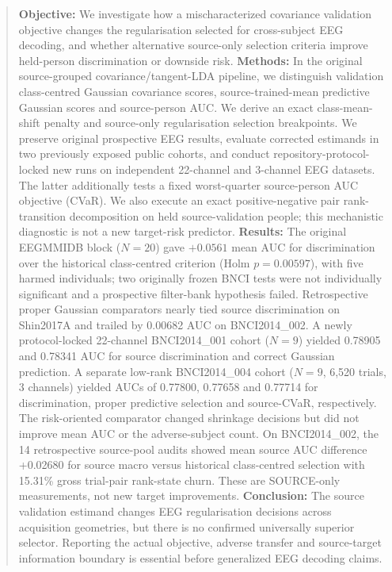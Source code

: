 \begin{abstract}
\textbf{Objective:} We investigate how a
mischaracterized covariance validation
objective changes the regularisation
selected for cross-subject EEG decoding,
and whether alternative source-only
selection criteria improve held-person
discrimination or downside risk.
\textbf{Methods:} In the original
source-grouped covariance/tangent-LDA
pipeline, we distinguish validation
class-centred Gaussian covariance
scores, source-trained-mean predictive
Gaussian scores and source-person
AUC. We derive an exact class-mean-shift
penalty and source-only regularisation
selection breakpoints. We preserve
original prospective EEG results,
evaluate corrected estimands in two
previously exposed public cohorts,
and conduct repository-protocol-locked
new runs on independent 22-channel and
3-channel EEG datasets. The latter
additionally tests a fixed worst-quarter
source-person AUC objective (CVaR).
We also execute an exact positive-negative
pair rank-transition decomposition on
held source-validation people; this
mechanistic diagnostic is not a new
target-risk predictor.
\textbf{Results:} The original EEGMMIDB
block ($N=20$) gave $+0.0561$ mean AUC
for discrimination over the historical
class-centred criterion
(Holm $p=0.00597$), with five harmed
individuals; two originally frozen
BNCI tests were not individually
significant and a prospective
filter-bank hypothesis failed.
Retrospective proper Gaussian
comparators nearly tied source
discrimination on Shin2017A and
trailed by 0.00682 AUC on
BNCI2014\_002. A newly protocol-locked
22-channel BNCI2014\_001 cohort
($N=9$) yielded 0.78905 and 0.78341
AUC for source discrimination and
correct Gaussian prediction.
A separate low-rank BNCI2014\_004
cohort ($N=9$, 6,520 trials,
3 channels) yielded AUCs of
0.77800, 0.77658 and 0.77714
for discrimination, proper predictive
selection and source-CVaR, respectively.
The risk-oriented comparator changed
shrinkage decisions but did not improve
mean AUC or the adverse-subject count.
On BNCI2014\_002, the 14 retrospective
source-pool audits showed mean source
AUC difference +0.02680 for source
macro versus historical class-centred
selection with 15.31\% gross trial-pair
rank-state churn. These are SOURCE-only
measurements, not new target improvements.
\textbf{Conclusion:} The source
validation estimand changes EEG
regularisation decisions across
acquisition geometries, but there
is no confirmed universally superior
selector. Reporting the actual
objective, adverse transfer and
source-target information boundary
is essential before generalized
EEG decoding claims.
\end{abstract}

